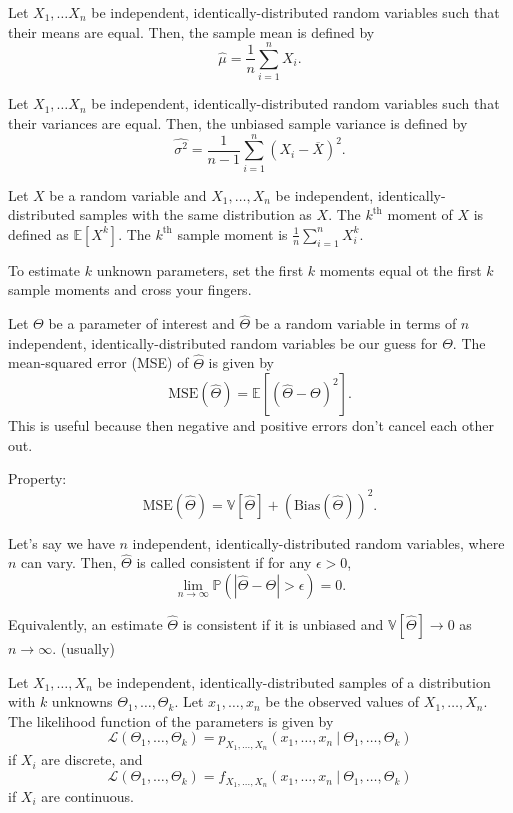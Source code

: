\documentclass{article}
\begin{document}
\medskip
{}

    Let $X_1, \hdots X_n$ be independent, identically-distributed random variables such that their means are equal. Then, the sample mean is defined by $$\hat\mu = \frac1n\sum_{i=1}^nX_i.$$

\medskip
{}

    Let $X_1, \hdots X_n$ be independent, identically-distributed random variables such that their variances are equal. Then, the unbiased sample variance is defined by $$\hat{\sigma^2} = \frac1{n-1}\sum_{i=1}^n(X_i-\overline X)^2.$$

\medskip
{}

    Let $X$ be a random variable and $X_1, \hdots, X_n$ be independent, identically-distributed samples with the same distribution as $X$. The $k^\text{th}$ moment of $X$ is defined as $\mathbb E[X^k]$. The $k^\text{th}$ sample moment is $\frac1n \sum_{i=1}^nX_i^k$.

    To estimate $k$ unknown parameters, set the first $k$ moments equal ot the first $k$ sample moments and cross your fingers.

\medskip
{}

    Let $\Theta$ be a parameter of interest and $\hat\Theta$ be a random variable in terms of $n$ independent, identically-distributed random variables be our guess for $\Theta$. The mean-squared error (MSE) of $\hat\Theta$ is given by \[\text{MSE}(\hat\Theta)=  \mathbb E[(\hat\Theta - \Theta)^2].\] This is useful because then negative and positive errors don't cancel each other out.

    Property: \[\text{MSE}(\hat\Theta) = \mathbb V[\hat\Theta] + (\text{Bias}(\hat\Theta))^2.\]

\medskip
{}

    Let's say we have $n$ independent, identically-distributed random variables, where $n$ can vary. Then, $\hat\Theta$ is called consistent if for any $\epsilon > 0$, \[\lim_{n\to\infty} \mathbb P(|\hat\Theta - \Theta| > \epsilon) = 0.\]

    Equivalently, an estimate $\hat\Theta$ is consistent if it is unbiased and $\mathbb V[\hat\Theta] \to 0$ as $n \to \infty$. (usually)

\medskip
{}

    Let $X_1, \hdots, X_n$ be independent, identically-distributed samples of a distribution with $k$ unknowns $\Theta_1, \hdots, \Theta_k$. Let $x_1, \hdots, x_n$ be the observed values of $X_1, \hdots, X_n$. The likelihood function of the parameters is given by
    $$\mathcal L(\Theta_1, \hdots, \Theta_k) = p_{X_1, \hdots, X_n}(x_1, \hdots, x_n~|~\Theta_1, \hdots, \Theta_k)$$ if $X_i$ are discrete, and
    $$\mathcal L(\Theta_1, \hdots, \Theta_k) = f_{X_1, \hdots, X_n}(x_1, \hdots, x_n~|~\Theta_1, \hdots, \Theta_k)$$ if $X_i$ are continuous.
\end{document}

